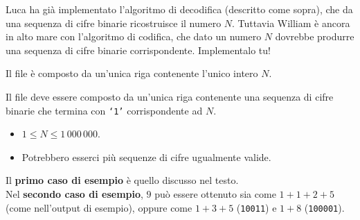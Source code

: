 Luca ha gi\`a implementato l'algoritmo di decodifica (descritto come sopra), che da una sequenza di cifre binarie ricostruisce il numero $N$. Tuttavia William \`e ancora in alto mare con l'algoritmo di codifica, che dato un numero $N$ dovrebbe produrre una sequenza di cifre binarie corrispondente. Implementalo tu!



\InputFile
Il file  è composto da un'unica riga contenente l'unico intero $N$.


\OutputFile
Il file \outputfile{} deve essere composto da un'unica riga contenente una sequenza di cifre binarie che termina con \texttt{`1'} corrispondente ad $N$.



\Constraints

\begin{itemize}[nolistsep, itemsep=2mm]
	\item $1 \le N \le 1\,000\,000$.
	\item Potrebbero esserci pi\`u sequenze di cifre ugualmente valide.
\end{itemize}



\Examples

\begin{example}
%
%
\end{example}



\Explanation

Il \textbf{primo caso di esempio} \`e quello discusso nel testo.\\[2mm]
Nel \textbf{secondo caso di esempio}, $9$ pu\`o essere ottenuto sia come $1+1+2+5$ (come nell'output di esempio), oppure come $1+3+5$ (\texttt{10011}) e $1+8$ (\texttt{100001}).


%    
